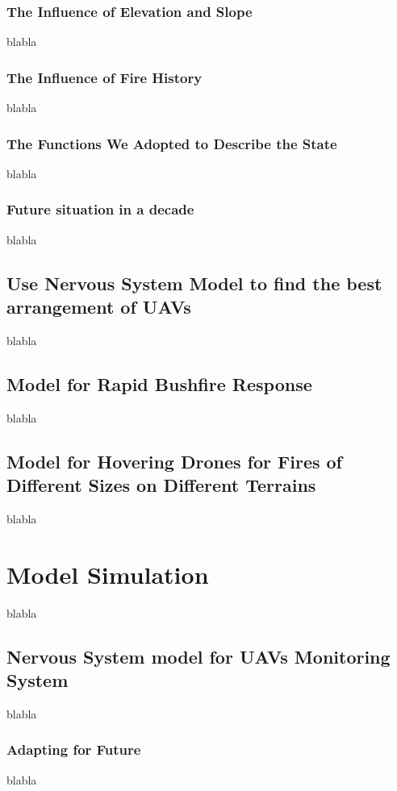\documentclass[13pt]{ctexart} %
\begin{document}
\subsubsection{The Influence of Elevation and Slope}
blabla

\subsubsection{The Influence of Fire History}
blabla

\subsubsection{The Functions We Adopted to Describe the State}
blabla

\subsubsection{Future situation in a decade}
blabla

\subsection{Use Nervous System Model to find the best arrangement of UAVs}
blabla

\subsection{Model for Rapid Bushfire Response}
blabla

\subsection{Model for Hovering Drones for Fires of Different Sizes on Different Terrains}
blabla

\section{Model Simulation}
blabla

\subsection{Nervous System model for UAVs Monitoring System}
blabla

\subsubsection{Adapting for Future}
blabla
\end{document}
